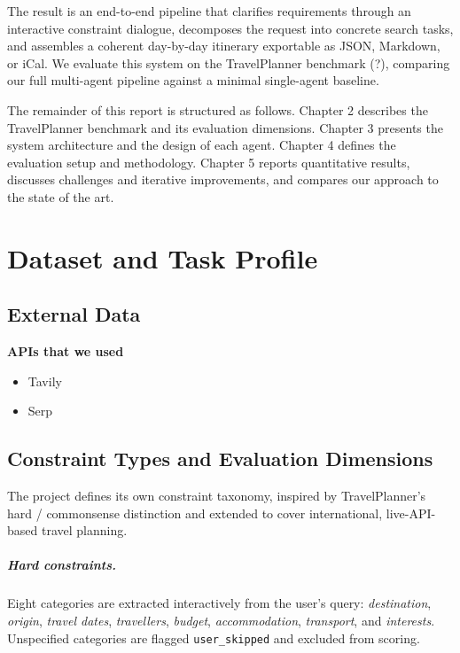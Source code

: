 \documentclass[a4paper,oneside,bibliography=totoc]{scrbook}
\begin{document}
The result is an end-to-end pipeline that clarifies requirements through an interactive constraint dialogue, decomposes the request into concrete search tasks, and assembles a coherent day-by-day itinerary exportable as JSON, Markdown, or iCal. We evaluate this system on the TravelPlanner benchmark (?), comparing our full multi-agent pipeline against a minimal single-agent baseline.

The remainder of this report is structured as follows. Chapter 2 describes the TravelPlanner benchmark and its evaluation dimensions. Chapter 3 presents the system architecture and the design of each agent. Chapter 4 defines the evaluation setup and methodology. Chapter 5 reports quantitative results, discusses challenges and iterative improvements, and compares our approach to the state of the art.


\chapter{Dataset and Task Profile}
\label{sec:data}

\section{External Data}

\textbf{APIs that we used}
\begin{itemize}
  \item Tavily
  \item Serp
\end{itemize}



\section{Constraint Types and Evaluation Dimensions}
\label{sec:data:constraints}
The project defines its own constraint taxonomy, inspired by
TravelPlanner's hard / commonsense distinction and extended to cover
international, live-API-based travel planning.

\paragraph{Hard constraints.}
Eight categories are extracted interactively from the user's query:
\emph{destination}, \emph{origin}, \emph{travel dates}, \emph{travellers},
\emph{budget}, \emph{accommodation}, \emph{transport}, and \emph{interests}.
Unspecified categories are flagged \texttt{user\_skipped} and excluded
from scoring.
\end{document}
